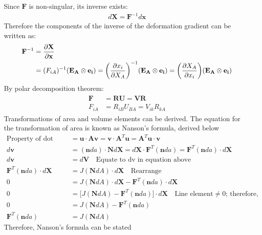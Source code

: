 \documentclass[12pt,3p]{article}
\numberwithin{equation}{section}
\begin{document}
Since $\mathbf{F}$ is non-singular, its inverse exists:
\begin{align}\label{38}
d \mathbf{X} = \mathbf{F}^{-1} d \mathbf{x}
\end{align}
Therefore the components of the inverse of the deformation gradient can be written as: 
\begin{align}\label{39}
\begin{split}
\mathbf{F}^{-1} &= \pdv{\mathbf{X}}{\mathbf{x}} \\
					 &= (F_{iA})^{-1} (\mathbf{E_A} \otimes \mathbf{e_i}) = \bigg( \pdv{x_i}{X_A} \bigg)^{-1} (\mathbf{E_A} \otimes \mathbf{e_i}) = \bigg( \pdv{X_A}{x_i} \bigg) (\mathbf{E_A} \otimes \mathbf{e_i}) 
\end{split}
\end{align}
By polar decomposition theorem:
\begin{align}\label{310}
\begin{split}
\mathbf{F} &= \mathbf{RU} = \mathbf{VR} \\
F_{iA} &= R_{iB} U_{BA} = V_{ik} R_{kA}
\end{split}
\end{align}
Transformations of area and volume elements can be derived. The equation for the transformation of area is known as Nanson's formula, derived below
\begin{align*}
\text{Property of dot products} &= \mathbf{u} \cdot \mathbf{Av} = \mathbf{v} \cdot \mathbf{A}^T \mathbf{u} = \mathbf{A}^T \mathbf{u} \cdot \mathbf{v} \\
d \mathbf{v} &= (\mathbf{n} da) \cdot \mathbf{N} d \mathbf{X} = d\mathbf{X} \cdot \mathbf{F}^T (\mathbf{n} da) = \mathbf{F}^T (\mathbf{n} da) \cdot d\mathbf{X} \\
d\mathbf{v} &= d\mathbf{V} \quad \text{Equate to dv in equation above}\\
\mathbf{F}^T (\mathbf{n} da) \cdot d\mathbf{X} &= J (\mathbf{N} dA) \cdot d\mathbf{X} \quad \text{Rearrange} \\
0 &= J (\mathbf{N} dA) \cdot d\mathbf{X} - 
\mathbf{F}^T (\mathbf{n} da) \cdot d\mathbf{X} \\
0 &= \big[ J (\mathbf{N} dA)- 
\mathbf{F}^T (\mathbf{n} da) \big] \cdot d\mathbf{X} \quad \text{Line element} \neq 0 \text{; therefore,} \\
0 &= J (\mathbf{N} dA) - 
\mathbf{F}^T (\mathbf{n} da) \\
\mathbf{F}^T (\mathbf{n} da) &= J (\mathbf{N} dA)
\end{align*}
Therefore, Nanson's formula can be stated
\end{document}
